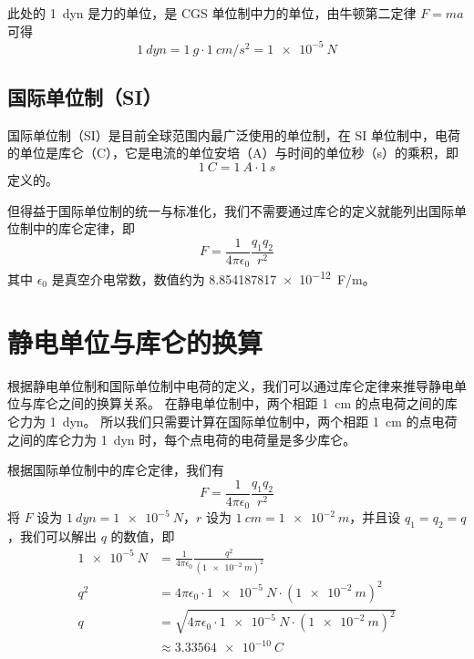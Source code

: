 \documentclass[12pt,a4paper,UTF8,fontset=lxgw]{ctexart}
\begin{document}
此处的 \qty{1}{dyn} 是力的单位，是 CGS 单位制中力的单位，由牛顿第二定律 $F = ma$ 可得
\begin{equation}
    \qty{1}{dyn} = \qty{1}{g} \cdot \qty{1}{cm/s^2} = \qty{1e-5}{N}
\end{equation}

\subsection{国际单位制（SI）}
国际单位制（SI）是目前全球范围内最广泛使用的单位制，在 SI 单位制中，电荷的单位是库仑（C），它是电流的单位安培（A）与时间的单位秒（s）的乘积，即
\begin{equation}
    \qty{1}{C} = \qty{1}{A} \cdot \qty{1}{s}
\end{equation}
定义的。

但得益于国际单位制的统一与标准化，我们不需要通过库仑的定义就能列出国际单位制中的库仑定律，即
\begin{equation}
    F = \frac{1}{4\pi \epsilon_0} \frac{q_1 q_2}{r^2}
\end{equation}
其中 $\epsilon_0$ 是真空介电常数，数值约为 \qty{8.854187817e-12}{F/m}。

\section{静电单位与库仑的换算}
根据静电单位制和国际单位制中电荷的定义，我们可以通过库仑定律来推导静电单位与库仑之间的换算关系。
在静电单位制中，两个相距 \qty{1}{cm} 的点电荷之间的库仑力为 \qty{1}{dyn}。
所以我们只需要计算在国际单位制中，两个相距 \qty{1}{cm} 的点电荷之间的库仑力为 \qty{1}{dyn} 时，每个点电荷的电荷量是多少库仑。

根据国际单位制中的库仑定律，我们有
\begin{equation}
    F = \frac{1}{4\pi \epsilon_0} \frac{q_1 q_2}{r^2}
\end{equation}
将 $F$ 设为 $\qty{1}{dyn}=\qty{1e-5}{N}$，$r$ 设为 $\qty{1}{cm}=\qty{1e-2}{m}$，并且设 $q_1 = q_2 = q$，我们可以解出 $q$ 的数值，即
\begin{equation}
    \begin{aligned}
        \qty{1e-5}{N} & = \frac{1}{4\pi \epsilon_0} \frac{q^2}{(\qty{1e-2}{m})^2}            \\
        q^2           & = 4\pi \epsilon_0 \cdot \qty{1e-5}{N} \cdot (\qty{1e-2}{m})^2        \\
        q             & = \sqrt{4\pi \epsilon_0 \cdot \qty{1e-5}{N} \cdot (\qty{1e-2}{m})^2} \\
                      & \approx \qty{3.33564e-10}{C}
    \end{aligned}
\end{equation}
\end{document}
